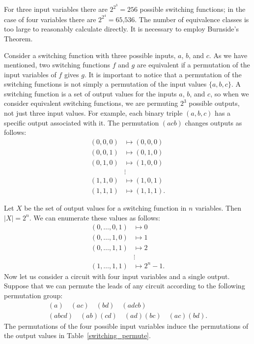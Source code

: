  
For three input variables there are $2^{2^3}=256$ possible switching
functions; in the case of four variables there are $2^{2^4} =
\mbox{65,536}$. The number of equivalence classes is too large to reasonably
calculate directly. It is necessary to employ  Burnside's Theorem.
 
 
Consider a  switching function with three possible inputs, $a$, $b$,
and $c$. As we have mentioned, two switching functions $f$ and $g$ are
equivalent if a permutation of the input variables of $f$ gives $g$.
It is important to notice that a permutation of the switching
functions is not simply a permutation of the input values $\{a, b,
c\}$. A switching function is a set of output values for the inputs
$a$, $b$, and $c$, so when we consider equivalent switching functions, we
are permuting $2^3$ possible outputs, not just three input values. For
example, each binary triple $(a, b, c)$ has a specific output
associated with it. The  permutation $(acb)$ changes outputs as follows: 
\begin{align*}
(0, 0, 0) & \mapsto  (0, 0, 0) \\
(0, 0, 1) & \mapsto  (0, 1, 0) \\
(0, 1, 0) & \mapsto  (1, 0, 0) \\
& \vdots  \\
(1, 1, 0) & \mapsto  (1, 0, 1) \\
(1, 1, 1) & \mapsto  (1, 1, 1).
\end{align*}

Let $X$ be the set of output values for a switching function in $n$
variables. Then $|X|=2^n$. We can enumerate these values as follows: 
\begin{align*}
(0, \ldots, 0, 1) & \mapsto  0 \\
(0, \ldots, 1, 0) & \mapsto  1 \\
(0, \ldots, 1, 1) & \mapsto  2 \\
& \vdots  \\
(1, \ldots, 1, 1) & \mapsto  2^n-1.
\end{align*}
Now let us consider a circuit with four input variables and a single
output. Suppose that we can permute the leads  of any circuit
according to the following permutation group: 
\begin{gather*}
(a)    \quad (ac)     \quad (bd)     \quad (adcb) \\
(abcd) \quad (ab)(cd) \quad (ad)(bc) \quad (ac)(bd).
\end{gather*}
The permutations of the four possible input variables induce the
permutations of the output values in Table~\ref{switching_permute}. 
 
